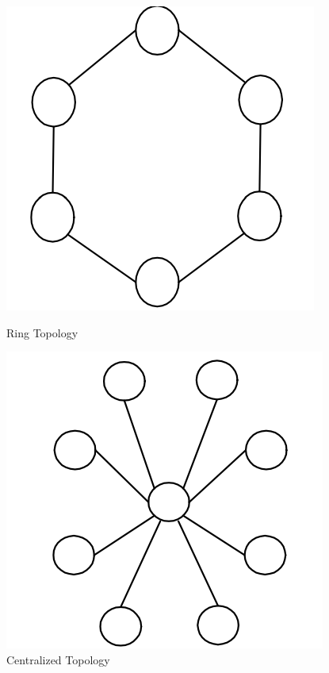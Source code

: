 \documentclass{article}
\begin{document}
\begin{figure}[!ht]
    \begin{minipage}{0.45\textwidth}
        \centering
        \includegraphics[scale=0.3]{ring.png} %
        \caption{Ring Topology}
    \end{minipage}\hfill
    \begin{minipage}{0.45\textwidth}
        \centering
        \includegraphics[scale=0.3]{central.png} %
        \caption{Centralized Topology}
    \end{minipage}
\vfill 
    \begin{minipage}{0.45\textwidth}
        \centering

\end{minipage}
\end{figure}
\end{document}
